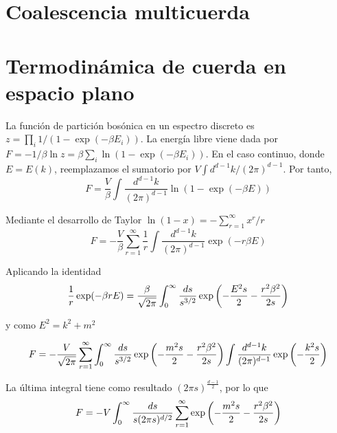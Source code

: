 \section{Coalescencia multicuerda}

\section{Termodinámica de cuerda en espacio plano}


La función de partición bosónica en un espectro discreto es $z=\prod_i 1/(1-\exp(-\beta E_i))$.
La energía libre viene dada por $F=-1/\beta \ln z=\beta\sum_i \ln(1-\exp(-\beta E_i))$.
En el caso continuo, donde $E=E(k)$, reemplazamos el sumatorio por $V\int d^{d-1}k/(2\pi)^{d-1}$.
Por tanto,
\begin{equation}
  F=\frac{V}{\beta}\int \frac{d^{d-1}k}{(2\pi)^{d-1}}\ln(1-\exp(-\beta E))
\end{equation}

Mediante el desarrollo de Taylor $\ln(1-x)=-\sum^\infty_{r=1} x^r/r$
\begin{equation}
  F=-\frac{V}{\beta}\sum^\infty_{r=1} \frac 1 r\int \frac{d^{d-1}k}{(2\pi)^{d-1}}\exp(-r\beta E)
\end{equation}

Aplicando la identidad
\begin{equation}
  \frac 1 r \exp(-\beta r E)=\frac{\beta}{\sqrt{2\pi}}\int_0^\infty \frac{ds}{s^{3/2}}\exp\qty(-\frac{E^2s}{2}-\frac{r^2\beta^2}{2s})
\end{equation}

y como $E^2=k^2+m^2$

\begin{equation}
  F=-\frac{V}{\sqrt{2\pi}}\sum^\infty_{r=1} \int_0^\infty \frac{ds}{s^{3/2}} \exp \qty(-\frac{m^2s}{2} -\frac{r^2\beta^2}{2s})
  \int \frac{d^{d-1}k}{(2\pi)^{d-1}}\exp\qty(-\frac{k^2s}{2})
\end{equation}

La última integral tiene como resultado $(2\pi s)^{\frac{d-1}{2}}$, por lo que
\begin{equation}
  F=-V \int_0^\infty \frac{ds}{s(2\pi s)^{d/2}}\sum^\infty_{r=1} \exp \qty(-\frac{m^2s}{2}- \frac{r^2\beta^2}{2s})
\end{equation}

